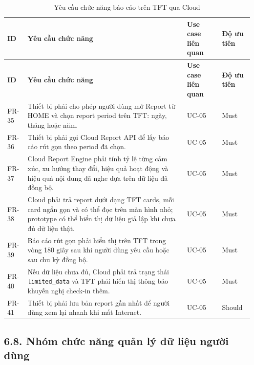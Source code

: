 \documentclass[12pt,a4paper]{article}
\begin{document}
\begin{center}
\scriptsize
\begin{longtable}{|P{0.12\textwidth}|P{0.44\textwidth}|P{0.24\textwidth}|P{0.12\textwidth}|}
\caption{Yêu cầu chức năng báo cáo trên TFT qua Cloud}\\
\hline
\textbf{ID} & \textbf{Yêu cầu chức năng} & \textbf{Use case liên quan} & \textbf{Độ ưu tiên} \\
\hline
\endfirsthead
\hline
\textbf{ID} & \textbf{Yêu cầu chức năng} & \textbf{Use case liên quan} & \textbf{Độ ưu tiên} \\
\hline
\endhead
FR-35 & Thiết bị phải cho phép người dùng mở Report từ HOME và chọn report period trên TFT: ngày, tháng hoặc năm. & UC-05 & Must \\
\hline
FR-36 & Thiết bị phải gọi Cloud Report API để lấy báo cáo rút gọn theo period đã chọn. & UC-05 & Must \\
\hline
FR-37 & Cloud Report Engine phải tính tỷ lệ từng cảm xúc, xu hướng thay đổi, hiệu quả hoạt động và hiệu quả nội dung đã nghe dựa trên dữ liệu đã đồng bộ. & UC-05 & Must \\
\hline
FR-38 & Cloud phải trả report dưới dạng TFT cards, mỗi card ngắn gọn và có thể đọc trên màn hình nhỏ; prototype có thể hiển thị dữ liệu giả lập khi chưa đủ dữ liệu thật. & UC-05 & Must \\
\hline
FR-39 & Báo cáo rút gọn phải hiển thị trên TFT trong vòng 180 giây sau khi người dùng yêu cầu hoặc sau chu kỳ đồng bộ. & UC-05 & Must \\
\hline
FR-40 & Nếu dữ liệu chưa đủ, Cloud phải trả trạng thái \texttt{limited\_data} và TFT phải hiển thị thông báo khuyến nghị check-in thêm. & UC-05 & Must \\
\hline
FR-41 & Thiết bị phải lưu bản report gần nhất để người dùng xem lại nhanh khi mất Internet. & UC-05 & Should \\
\hline
\end{longtable}
\normalsize
\end{center}

\subsection*{6.8. Nhóm chức năng quản lý dữ liệu người dùng}
\end{document}
